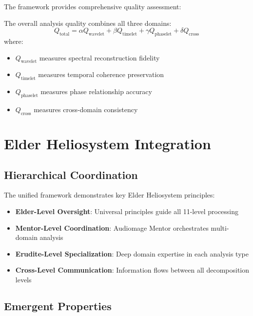 The framework provides comprehensive quality assessment:

\begin{definition}
The overall analysis quality combines all three domains:
\begin{equation}
Q_{\text{total}} = \alpha Q_{\text{wavelet}} + \beta Q_{\text{timelet}} + \gamma Q_{\text{phaselet}} + \delta Q_{\text{cross}}
\end{equation}
where:
\begin{itemize}
    \item $Q_{\text{wavelet}}$ measures spectral reconstruction fidelity
    \item $Q_{\text{timelet}}$ measures temporal coherence preservation
    \item $Q_{\text{phaselet}}$ measures phase relationship accuracy
    \item $Q_{\text{cross}}$ measures cross-domain consistency
\end{itemize}
\end{definition}

\section{Elder Heliosystem Integration}

\subsection{Hierarchical Coordination}

The unified framework demonstrates key Elder Heliosystem principles:

\begin{itemize}
    \item \textbf{Elder-Level Oversight}: Universal principles guide all 11-level processing
    \item \textbf{Mentor-Level Coordination}: Audiomage Mentor orchestrates multi-domain analysis
    \item \textbf{Erudite-Level Specialization}: Deep domain expertise in each analysis type
    \item \textbf{Cross-Level Communication}: Information flows between all decomposition levels
\end{itemize}

\subsection{Emergent Properties}

